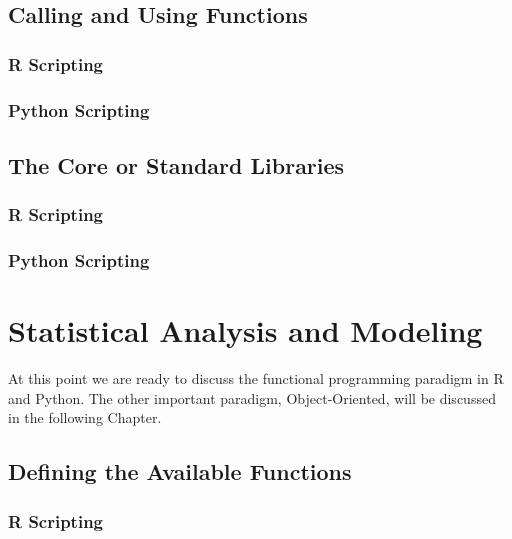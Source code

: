 \documentclass[]{book}
\theoremstyle{definition}
\theoremstyle{definition}
\theoremstyle{definition}
\theoremstyle{remark}
\begin{document}
\section{Calling and Using
Functions}\label{calling-and-using-functions-1}

\subsection{R Scripting}\label{r-scripting-9}

\subsection{Python Scripting}\label{python-scripting-9}

\section{The Core or Standard
Libraries}\label{the-core-or-standard-libraries}

\subsection{R Scripting}\label{r-scripting-10}

\subsection{Python Scripting}\label{python-scripting-10}

\chapter{Statistical Analysis and
Modeling}\label{statistical-analysis-and-modeling}

At this point we are ready to discuss the functional programming
paradigm in R and Python. The other important paradigm, Object-Oriented,
will be discussed in the following Chapter.

\section{Defining the Available
Functions}\label{defining-the-available-functions}

\subsection{R Scripting}\label{r-scripting-11}
\end{document}
